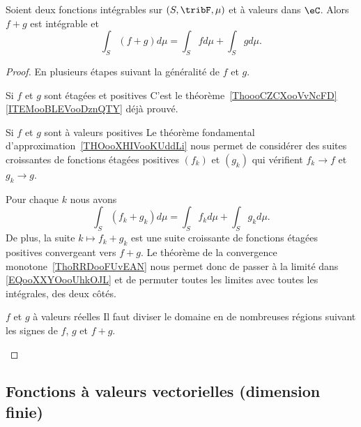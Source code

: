 \begin{proposition}     \label{PROPooFIYEooCpdmwZ}
    Soient deux fonctions intégrables sur \( (S,\tribF,\mu)\) et à valeurs dans \( \eC\). Alors \( f+g\) est intégrable et
    \begin{equation}
        \int_S(f+g)d\mu=\int_Sfd\mu+\int_Sgd\mu.
    \end{equation}
\end{proposition}

\begin{proof}
    En plusieurs étapes suivant la généralité de \( f\) et \( g\).
    \begin{subproof}
        \item[Si \( f\) et \( g\) sont étagées et positives]
            C'est le théorème~\ref{ThoooCZCXooVvNcFD}\ref{ITEMooBLEVooDznQTY} déjà prouvé.
        \item[Si \(f\) et \( g\) sont à valeurs positives]
            Le théorème fondamental d'approximation~\ref{THOooXHIVooKUddLi} nous permet de considérer des suites croissantes de fonctions étagées positives \( (f_k)\) et \( (g_k)\) qui vérifient \( f_k\to f\) et \( g_k\to g\).

            Pour chaque \( k\) nous avons
            \begin{equation}        \label{EQooXXYOooUhkOJL}
                \int_S(f_k+g_k)d\mu=\int_Sf_kd\mu+\int_Sg_kd\mu.
            \end{equation}
            De plus, la suite \( k\mapsto f_k+g_k\) est une suite croissante de fonctions étagées positives convergeant vers \( f+g\). Le théorème de la convergence monotone~\ref{ThoRRDooFUvEAN} nous permet donc de passer à la limité dans \eqref{EQooXXYOooUhkOJL} et de permuter toutes les limites avec toutes les intégrales, des deux côtés.
        \item[\( f\) et \( g\) à valeurs réelles]
            Il faut diviser le domaine en de nombreuses régions suivant les signes de \( f\), \( g\) et \( f+g\).
    \end{subproof}
\end{proof}

\subsection{Fonctions à valeurs vectorielles (dimension finie)}


